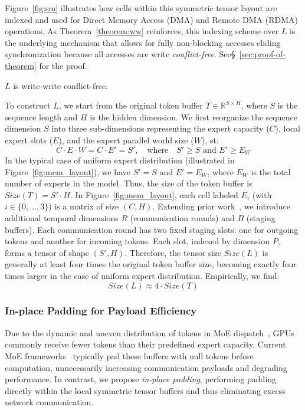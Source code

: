 Figure~\ref{fig:sm} illustrates how cells within this symmetric tensor layout are indexed
and used for Direct Memory Access (DMA) and Remote DMA (RDMA) operations.
As Theorem~\ref{theorem:ww} reinforces,
this indexing scheme over $L$ is the underlying mechanism that allows for fully non-blocking accesses eliding
synchronization because all accesses are write \emph{conflict-free}.
See\S~\ref{sec:proof-of-theorem} for the proof.
\begin{theorem}\label{theorem:ww}
    $L$ is write-write conflict-free.
\end{theorem}
To construct $L$, we start from the original token buffer $T \in \mathbb{R}^{S \times H}$, where $S$ is the sequence length and $H$ is the hidden dimension. We first reorganize the sequence dimension $S$ into three sub-dimensions representing the expert capacity ($C$), local expert slots ($E$), and the expert parallel world size ($W$), st:
\[
C \cdot E \cdot W = C \cdot E' = S', \quad\text{where}\quad S' \geq S \text{ and } E' \geq E_W
\]
In the typical case of uniform expert distribution (illustrated in Figure~\ref{fig:mem_layout}),
we have $S' = S$ and $E' = E_W$, where $E_W$ is the total number of experts in the model.
Thus, the size of the token buffer is $Size(T) = S' \cdot H$.
In Figure~\ref{fig:mem_layout}, each cell labeled $E_i$ (with $i \in \{0,\ldots,3\}$) is a matrix of size $(C, H)$.
Extending prior work~\cite{DBLP:conf/iclr/LepikhinLXCFHKS21, comet}, we introduce additional temporal dimensions $R$ (communication rounds) and $B$ (staging buffers). Each communication round has two fixed staging slots: one for outgoing tokens and another for incoming tokens. Each slot, indexed by dimension $P$, forms a tensor of shape $(S', H)$. Therefore, the tensor size $Size(L)$ is generally at least four times the original token buffer size, becoming exactly four times larger in the case of uniform expert distribution. Empirically, we find:
\[
    Size(L) \approx 4 \cdot Size(T)
\]

\subsubsection{In-place Padding for Payload Efficiency}\label{subsubsec:payload}
Due to the dynamic and uneven distribution of tokens in MoE dispatch~\cite{bmamba}, GPUs commonly receive fewer tokens than their predefined expert capacity. Current MoE frameworks~\cite{pmlr-v162-rajbhandari22a} typically pad these buffers with null tokens before computation, unnecessarily increasing communication payloads and degrading performance. In contrast, we propose \emph{in-place padding}, performing padding directly within the local symmetric tensor buffers and thus eliminating excess network communication.

